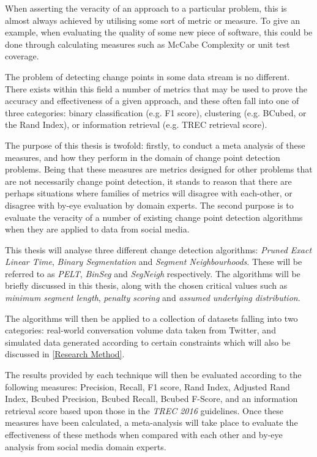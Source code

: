 \documentclass{uvamscse}	%
\begin{document}
When asserting the veracity of an approach to a particular problem, this is almost always achieved by utilising some sort of metric or measure. To give an example, when evaluating the quality of some new piece of software, this could be done through calculating measures such as McCabe Complexity or unit test coverage.

The problem of detecting change points in some data stream is no different. There exists within this field a number of metrics that may be used to prove the accuracy and effectiveness of a given approach, and these often fall into one of three categories: binary classification (e.g. F1 score), clustering (e.g. BCubed, or the Rand Index), or information retrieval (e.g. TREC retrieval score).

The purpose of this thesis is twofold: firstly, to conduct a meta analysis of these measures, and how they perform in the domain of change point detection problems. Being that these measures are metrics designed for other problems that are not necessarily change point detection, it stands to reason that there are perhaps situations where families of metrics will disagree with each-other, or disagree with by-eye evaluation by domain experts. The second purpose is to evaluate the veracity of a number of existing change point detection algorithms when they are applied to data from social media.

This thesis will analyse three different change detection algorithms: \emph{Pruned Exact Linear Time}, \emph{Binary Segmentation} and \emph{Segment Neighbourhoods}. These will be referred to as \emph{PELT}, \emph{BinSeg} and \emph{SegNeigh} respectively. The algorithms will be briefly discussed in this thesis, along with the chosen critical values such as \emph{minimum segment length}, \emph{penalty scoring} and \emph{assumed underlying distribution}.

The algorithms will then be applied to a collection of datasets falling into two categories: real-world conversation volume data taken from Twitter, and simulated data generated according to certain constraints which will also be discussed in \autoref{Research Method}.

The results provided by each technique will then be evaluated according to the following measures: Precision, Recall, F1 score, Rand Index, Adjusted Rand Index, Bcubed Precision, Bcubed Recall, Bcubed F-Score, and an information retrieval score based upon those in the \emph{TREC 2016} guidelines. Once these measures have been calculated, a meta-analysis will take place to evaluate the effectiveness of these methods when compared with each other and by-eye analysis from social media domain experts.
\end{document}
